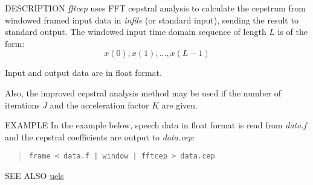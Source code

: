 \begin{synopsis}
\item[fftcep] [ --m $M$ ] [ --l $L$ ] [ --j $J$ ] [ --k $K$ ] 
	    [ --e $E$ ] [ {\em infile} ] 
\end{synopsis}

\begin{qsection}{DESCRIPTION}
{\em fftcep} uses FFT cepstral analysis to calculate the cepstrum 
from windowed framed input data in {\em infile} (or standard input), 
sending the result to standard output.
The windowed input time domain sequence of length $L$ is of the form:
\begin{displaymath}
  x(0),x(1),\dots,x(L-1)
\end{displaymath}
\par
Input and output data are in float format.
\par
Also, the improved cepstral analysis method \cite{ref:icep-IECE} may be used if the
number of iterations $J$ and the acceleration factor $K$ are given.
\end{qsection}

\begin{options}
\end{options}

\begin{qsection}{EXAMPLE}
In the example below, speech data in float format is read from
{\em data.f} and the cepstral coefficients are output to {\em data.cep}:
\begin{quote}
  \verb!frame < data.f | window | fftcep > data.cep !
\end{quote}
\end{qsection}

\begin{qsection}{SEE ALSO}
\hyperlink{uels}{uels}
\end{qsection}
